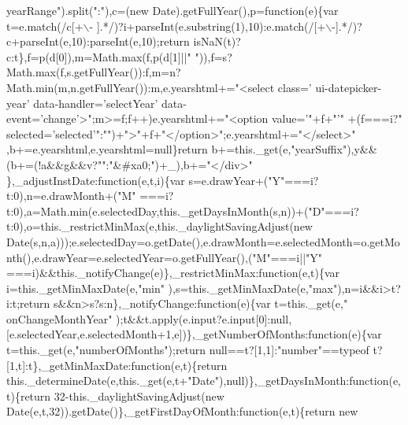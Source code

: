 \begin{DoxyCode}
      yearRange\textcolor{stringliteral}{").split("}:\textcolor{stringliteral}{"),c=(new Date).getFullYear(),p=function(e)\{var t=e.match(/c[+\(\backslash\)-
      ].*/)?i+parseInt(e.substring(1),10):e.match(/[+\(\backslash\)-].*/)?c+parseInt(e,10):parseInt(e,10);return isNaN(t)?c:t\},f=p(d[0]),m=Math.max(f,p(d[1]||"}\textcolor{stringliteral}{
      ")),f=s?Math.max(f,s.getFullYear()):f,m=n?Math.min(m,n.getFullYear()):m,e.yearshtml+="}<select \textcolor{keyword}{class}=\textcolor{stringliteral}{'
      ui-datepicker-year'} data-handler=\textcolor{stringliteral}{'selectYear'} data-\textcolor{keyword}{event}=\textcolor{stringliteral}{'change'}>\textcolor{stringliteral}{";m>=f;f++)e.yearshtml+="}<option value=\textcolor{stringliteral}{'"+f+"'}\textcolor{stringliteral}{"
      +(f===i?"} selected=\textcolor{stringliteral}{'selected'}\textcolor{stringliteral}{":"}\textcolor{stringliteral}{")+"}>\textcolor{stringliteral}{"+f+"}</option>\textcolor{stringliteral}{";e.yearshtml+="}</select>\textcolor{stringliteral}{"
      ,b+=e.yearshtml,e.yearshtml=null\}return b+=this.\_get(e,"}yearSuffix\textcolor{stringliteral}{"),y&&(b+=(!a&&g&&v?"}\textcolor{stringliteral}{":"}&#xa0;\textcolor{stringliteral}{")+\_),b+="}</div>\textcolor{stringliteral}{"
      \},\_adjustInstDate:function(e,t,i)\{var s=e.drawYear+("}Y\textcolor{stringliteral}{"===i?t:0),n=e.drawMonth+("}M\textcolor{stringliteral}{"
      ===i?t:0),a=Math.min(e.selectedDay,this.\_getDaysInMonth(s,n))+("}D\textcolor{stringliteral}{"===i?t:0),o=this.\_restrictMinMax(e,this.\_daylightSavingAdjust(new
       Date(s,n,a)));e.selectedDay=o.getDate(),e.drawMonth=e.selectedMonth=o.getMonth(),e.drawYear=e.selectedYear=o.getFullYear(),("}M\textcolor{stringliteral}{"===i||"}Y\textcolor{stringliteral}{"
      ===i)&&this.\_notifyChange(e)\},\_restrictMinMax:function(e,t)\{var i=this.\_getMinMaxDate(e,"}min\textcolor{stringliteral}{"
      ),s=this.\_getMinMaxDate(e,"}max\textcolor{stringliteral}{"),n=i&&i>t?i:t;return s&&n>s?s:n\},\_notifyChange:function(e)\{var t=this.\_get(e,"}
      onChangeMonthYear\textcolor{stringliteral}{"
      );t&&t.apply(e.input?e.input[0]:null,[e.selectedYear,e.selectedMonth+1,e])\},\_getNumberOfMonths:function(e)\{var t=this.\_get(e,"}numberOfMonths\textcolor{stringliteral}{");return null==t?[1,1]:"}number\textcolor{stringliteral}{"==typeof
       t?[1,t]:t\},\_getMinMaxDate:function(e,t)\{return this.\_determineDate(e,this.\_get(e,t+"}Date\textcolor{stringliteral}{"),null)\},\_getDaysInMonth:function(e,t)\{return
       32-this.\_daylightSavingAdjust(new Date(e,t,32)).getDate()\},\_getFirstDayOfMonth:function(e,t)\{return new
}
\end{DoxyCode}
